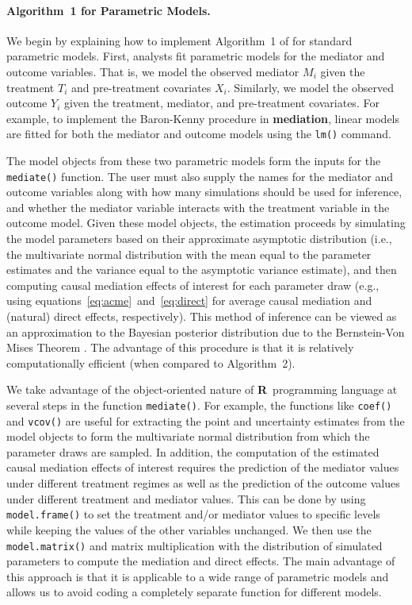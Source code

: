 \documentclass[11pt,letterpaper]{article}
\theoremstyle{plain}
\newcommand\bR{{\bf R}}
\newcommand\bmediation{{\bf mediation}}
\begin{document}
\paragraph{Algorithm~1 for Parametric Models.}

We begin by explaining how to implement Algorithm~1 of
\citet{imai:keel:ting:10} for standard parametric models.  First,
analysts fit parametric models for the mediator and outcome
variables. That is, we model the observed mediator $M_i$ given the
treatment $T_i$ and pre-treatment covariates $X_i$.  Similarly, we
model the observed outcome $Y_i$ given the treatment, mediator, and
pre-treatment covariates.  For example, to implement the Baron-Kenny
procedure in \bmediation, linear models are fitted for both the
mediator and outcome models using the {\tt lm()} command.

The model objects from these two parametric models form the inputs for
the {\tt mediate()} function.  The user must also supply the names for
the mediator and outcome variables along with how many simulations
should be used for inference, and whether the mediator variable
interacts with the treatment variable in the outcome model.  Given
these model objects, the estimation proceeds by simulating the model
parameters based on their approximate asymptotic distribution (i.e.,
the multivariate normal distribution with the mean equal to the
parameter estimates and the variance equal to the asymptotic variance
estimate), and then computing causal mediation effects of interest for
each parameter draw (e.g., using
equations~\eqref{eq:acme}~and~\eqref{eq:direct} for average causal
mediation and (natural) direct effects, respectively).  This method of
inference can be viewed as an approximation to the Bayesian posterior
distribution due to the Bernstein-Von Mises Theorem
\citep{king:tomz:witt:00}.  The advantage of this procedure is that it
is relatively computationally efficient (when compared to
Algorithm~2).

We take advantage of the object-oriented nature of \bR\ programming
language at several steps in the function {\tt mediate()}.  For
example, the functions like {\tt coef()} and {\tt vcov()} are useful
for extracting the point and uncertainty estimates from the model
objects to form the multivariate normal distribution from which the
parameter draws are sampled.  In addition, the computation of the
estimated causal mediation effects of interest requires the prediction
of the mediator values under different treatment regimes as well as
the prediction of the outcome values under different treatment and
mediator values.  This can be done by using {\tt model.frame()} to set
the treatment and/or mediator values to specific levels while keeping
the values of the other variables unchanged.  We then use the {\tt
  model.matrix()} and matrix multiplication with the distribution of
simulated parameters to compute the mediation and direct effects.  The
main advantage of this approach is that it is applicable to a wide
range of parametric models and allows us to avoid coding a completely
separate function for different models.
\end{document}
